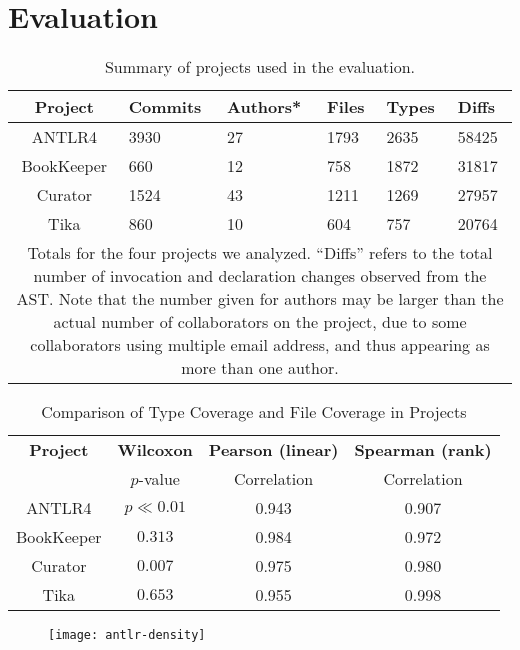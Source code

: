 \section{Evaluation}

\begin{table}[t]
\renewcommand{\arraystretch}{1.3}
\centering
\caption{Summary of projects used in the evaluation.}
\label{tab:project-summary}
\begin{tabular}{c|lllll}
\hline
\bfseries Project & \bfseries Commits & \bfseries Authors* & \bfseries Files &   \bfseries Types &  \bfseries  Diffs\\
\hline
ANTLR4 & 3930 & 27 & 1793 & 2635 & 58425\\
BookKeeper & 660 & 12 & 758 & 1872 & 31817\\
Curator & 1524 & 43 & 1211 & 1269 & 27957\\
Tika & 860 & 10 & 604 & 757 & 20764\\
\hline
\multicolumn{6}{p{\linewidth}}{\footnotesize Totals for the four projects we analyzed. ``Diffs'' refers to the total number of invocation and declaration changes observed from the AST. Note that the number given for authors may be larger than the actual number of collaborators on the project, due to some collaborators using multiple email address, and thus appearing as more than one author.}
\end{tabular}
\end{table}

\begin{table}[t]
\renewcommand{\arraystretch}{1.3}
\caption{Comparison of Type Coverage and File Coverage in Projects}
\label{tab:summary}
\centering
\begin{tabular}{c|ccc}
\hline
\bfseries Project & \bfseries Wilcoxon& \bfseries Pearson (linear) & \bfseries Spearman (rank) \\
& $p$-value & Correlation & Correlation \\
\hline
ANTLR4 & $p\ll0.01$ & 0.943 & 0.907\\
BookKeeper & $0.313$ & 0.984 & 0.972\\
Curator & $0.007$ & 0.975 & 0.980\\
Tika & $0.653$ & 0.955 & 0.998\\
\hline
\end{tabular}
\end{table}

\begin{figure}[h]
\centering
\texttt{[image: antlr-density]}
\caption{}
\end{figure}

